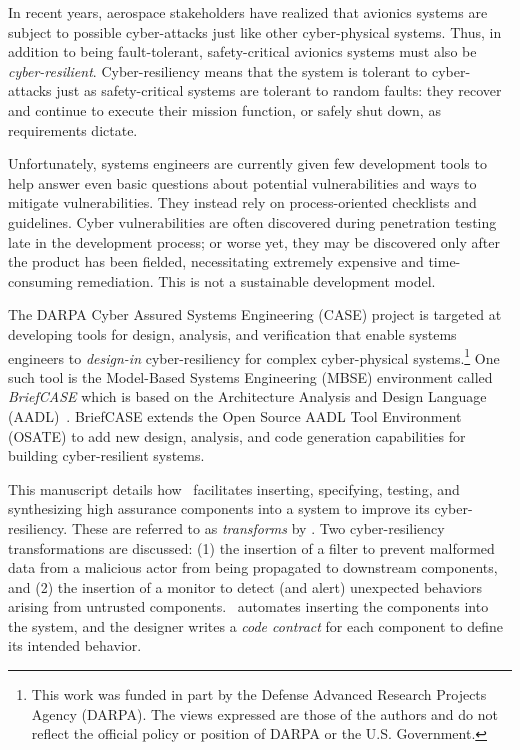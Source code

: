 
In recent years, aerospace stakeholders have realized that avionics systems are subject to possible cyber-attacks just like other cyber-physical systems.  
Thus, in addition to being fault-tolerant, safety-critical avionics systems must also be {\em cyber-resilient}.
Cyber-resiliency means that the system is tolerant to cyber-attacks just as safety-critical systems are tolerant to random faults: they recover and continue to execute their mission function, or safely shut down, as requirements dictate.

Unfortunately, systems engineers are currently given few development tools to help answer even basic questions about potential vulnerabilities and ways to mitigate vulnerabilities.
They instead rely on process-oriented checklists and guidelines.
Cyber vulnerabilities are often discovered during penetration testing late in the development process; or worse yet, they may be discovered only after the product has been fielded, necessitating extremely 
expensive and time-consuming remediation. This is not a sustainable development model.

The DARPA Cyber Assured Systems Engineering (CASE) project is targeted at developing tools for design, analysis, and verification that enable systems engineers to {\em design-in} cyber-resiliency for complex cyber-physical systems.\footnote{This work was funded in part by the Defense Advanced Research Projects Agency (DARPA).  The views expressed are those of the authors and do not reflect the official policy or position of DARPA or the U.S. Government.}
One such tool is the Model-Based Systems Engineering (MBSE) environment called {\em BriefCASE} which is based on the Architecture Analysis and Design Language (AADL)~\cite{aadl}.  BriefCASE extends the Open Source AADL Tool Environment (OSATE) to add new design, analysis, and code generation capabilities for building cyber-resilient systems.

This manuscript details how \brfcs\ facilitates inserting, specifying, testing, and synthesizing high assurance components into a system to improve its cyber-resiliency.
These  are referred to as \emph{transforms} by \brfcs.
Two cyber-resiliency transformations are discussed: (1) the insertion
of a filter to prevent malformed data from a malicious actor from
being propagated to downstream components, and (2) the insertion of a
monitor to detect (and alert) unexpected behaviors arising from
untrusted components.
\brfcs\ automates inserting the components into the system, and the designer writes a \emph{code contract} for each component to define its intended behavior.

